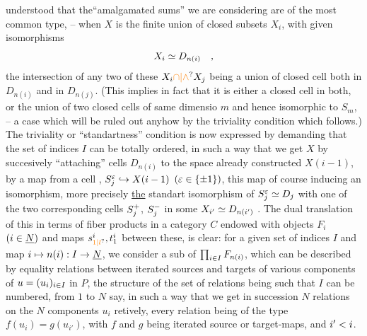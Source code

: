 
understood that the``amalgamated sums'' we are considering are of the most common type, -- when $X$ is the finite union of closed subsets $X_i$, with given isomorphisms
\[
X_i \simeq D_{n(i)}\quad ,
\]
the intersection of any two of these $X_i \handwritten{\unsure{\cap|\wedge}} X_j$ being a union of closed cell both in $D_{n(i)}$ and in $D_{n(j)}$. (This implies in fact that it is either a closed cell in both, or the union of two closed cells of same dimensio $m$ and hence isomorphic to $S_m$, -- a case which will be ruled out anyhow by the triviality condition which follows.) The triviality or ``standartness'' condition is now expressed by demanding that the set of indices $I$ can be totally ordered, in such a way that we get $X$ by succesively ``attaching'' cells $D_{n(i)}$  to the space already constructed\deleted{\unsure{,}} $X(i-1)$, by a map from a cell , $S_j^{\varepsilon}\hookrightarrow X(i-1)$ $(\varepsilon\in\{\mathord{\pm}1\})$, this map of course inducing an isomorphism, more precisely \uline{the} standart isomorphism of $S_j^{\varepsilon}\simeq D_j$ with one of the two corresponding cells $S_j^{+}$, $S_j^{-}$ in some $X_{i'}\simeq D_{n(i')}$ . The  dual translation of this in terms of fiber products in  a category $C$ endowed with objects $F_i$ $(i\in\underline{N})$ and maps $s^i_{\unsure{1|l}},t^i_1$ between these, is clear: for a given set of indices $I$ and map $i\mapsto n(i):I\to\underline{N}$, we consider a sub of $\prod_{i\in I}F_{n(i)}$, which can be described by equality relations between iterated sources and targets  of various components of $u=(u_i)_{i\in I}$ in $P$, the structure of the set of relations being such that $I$ can be numbered, from $1$ to $N$ say, in such a way that we get in succession $N$ relations on the $N$ components $u_i$  retively, every relation being of the type $f(u_i)=g(u_{i'})$, with $f$ and $g$ being iterated source or target-maps, and $i'<i$. 

